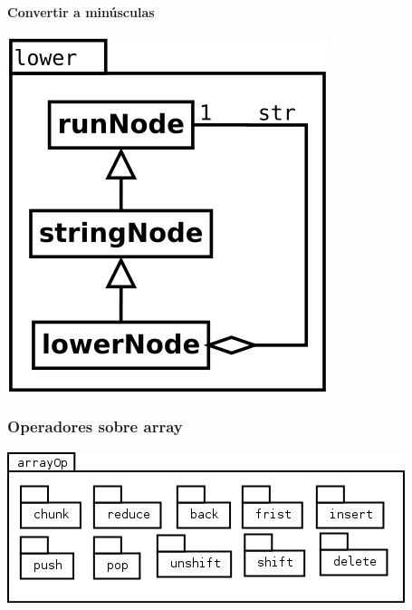 \paragraph {Convertir a minúsculas}
\begin{center}
\includegraphics[scale=0.4]{lower.png} \\
\end{center}

\pagebreak
\subsubsection {Operadores sobre array}
\begin{center}
\includegraphics[scale=0.4]{arrayOp-package.png} \\
\end{center}


